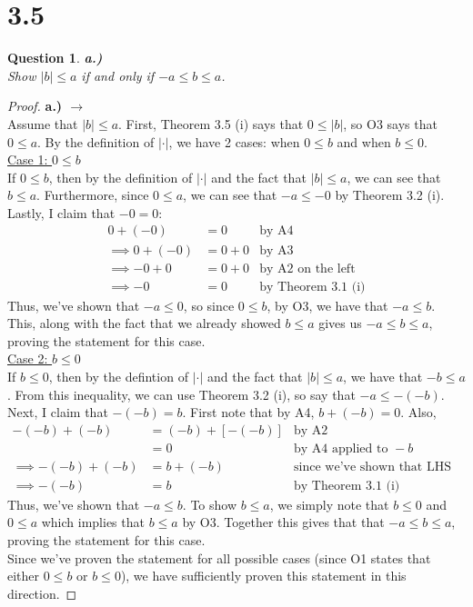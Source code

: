 \documentclass[10pt,a4paper]{article}
\newtheorem*{question*}{Question}
\theoremstyle{definition}
\begin{document}
\section*{3.5}
\begin{question*}{\textbf{a.)}}
\\Show $|b| \leq a$ if and only if $-a \leq b \leq a$.
\end{question*}

\begin{proof}{\textbf{a.) $\rightarrow$}}
\\Assume that $|b| \leq a$. First, Theorem 3.5 (i) says that $0 \leq |b|$, so O3 says that $0 \leq a$. By the definition of $| \cdot |$, we have 2 cases: when $0 \leq b$ and when $b \leq 0$.
\\\underline{Case 1: $0 \leq b$}
\\If $0 \leq b$, then by the definition of $| \cdot |$ and the fact that $|b| \leq a$, we can see that $b \leq a$. Furthermore, since $0 \leq a$, we can see that $-a \leq -0$ by Theorem 3.2 (i). Lastly, I claim that $-0 = 0$:
\begin{align*}
0 + (-0) &= 0 &\text{by A4}\\
\implies 0 + (-0) &= 0 + 0 &\text{by A3}\\
\implies -0 + 0 &= 0 + 0 &\text{by A2 on the left}\\
\implies -0 &= 0 &\text{by Theorem 3.1 (i)}
\end{align*}
Thus, we've shown that $-a \leq 0$, so since $0 \leq b$, by O3, we have that $-a \leq b$. This, along with the fact that we already showed $b \leq a$ gives us $-a \leq b \leq a$, proving the statement for this case. 
{$ $}
\\\underline{Case 2: $b \leq 0$}
\\If $b \leq 0$, then by the defintion of $| \cdot |$ and the fact that $|b| \leq a$, we have that $-b \leq a$. From this inequality, we can use Theorem 3.2 (i), so say that $-a \leq -(-b)$. Next, I claim that $-(-b) = b$. First note that by A4, $b + (-b) = 0$. Also,
\begin{align*}
-(-b) + (-b) &= (-b) + [-(-b)] &\text{by A2}\\
&= 0 &\text{by A4 applied to } -b\\
\implies -(-b) + (-b) &= b + (-b) &\text{since we've shown that LHS and RHS both equal 0}\\
\implies -(-b) &= b &\text{by Theorem 3.1 (i)}
\end{align*}
Thus, we've shown that $-a \leq b$. To show $b \leq a$, we simply note that $b \leq 0$ and $0 \leq a$ which implies that $b \leq a$ by O3. Together this gives that that $-a \leq b \leq a$, proving the statement for this case.
\\Since we've proven the statement for all possible cases (since O1 states that either $0 \leq b$ or $b \leq 0$), we have sufficiently proven this statement in this direction. 
\end{proof}
\end{document}
